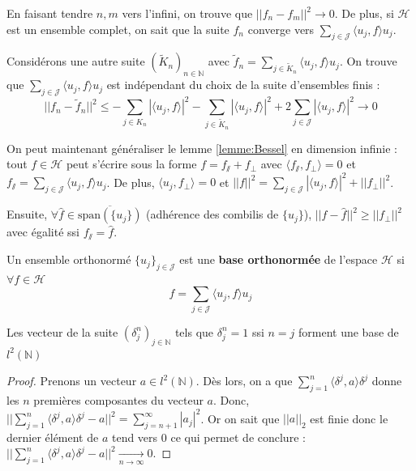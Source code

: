 En faisant tendre $n,m$ vers l'infini, on trouve que $||f_n-f_m||^2 \to 0$. De plus, si $\mathcal{H}$ est un ensemble complet, on sait que la suite $f_n$ converge vers $\sum \limits_{j\in\mathcal{J}} \langle u_j,f\rangle u_j$.

Considérons une autre suite $(\widetilde{K}_n)_{n\in\mathbb{N}}$ avec $\widetilde{f}_n = \sum_{j\in \widetilde{K}_n} \langle u_j,f\rangle u_j$. On trouve que $\sum_{j\in \mathcal{J}} \langle u_j,f\rangle u_j$ est indépendant du choix de la suite d'ensembles finis :
\begin{equation*}
    ||f_n - \widetilde{f}_n||^2 \leq  -\sum_{j\in K_n} |\langle u_j,f\rangle|^2 - \sum_{j\in \widetilde{K}_n} |\langle u_j,f\rangle|^2 + 2 \sum_{j\in \mathcal{J}} |\langle u_j,f\rangle|^2 \to 0
\end{equation*}

On peut maintenant généraliser le lemme \ref{lemme:Bessel} en dimension infinie : tout $f \in \mathcal{H}$ peut s'écrire sous la forme $f=f_\sslash + f_\bot$ avec $\langle f_\sslash,f_\bot \rangle = 0$ et $f_\sslash = \sum\limits_{j\in\mathcal{J}} \langle u_j,f\rangle u_j$. De plus, $\langle u_j,f_\bot\rangle = 0$ et $||f||^2 =\sum\limits_{j\in\mathcal{J}} |\langle u_j,f\rangle|^2+||f_\bot||^2$.

Ensuite, $\forall \hat{f} \in \overline{\text{span}(\{u_j\})}$ (adhérence des combilis de $\{u_j\}$), $||f-\hat{f}||^2\geq||f_\bot||^2$ avec égalité ssi $f_\sslash=\hat{f}$.

\begin{definition}
    Un ensemble orthonormé $\{u_j\}_{j\in\mathcal{J}}$ est une \textbf{base orthonormée} de l'espace $\mathcal{H}$ si $\forall f\in\mathcal{H}$
    \begin{equation*}
        f = \sum_{j\in\mathcal{J}} \langle u_j,f \rangle u_j
    \end{equation*}
\end{definition}

\begin{example}
    Les vecteur de la suite $(\delta^n_j)_{j\in\mathbb{N}}$ tels que $\delta^n_j=1$ ssi $n=j$ forment une base de $l^2(\mathbb{N})$
\end{example}
\begin{proof}
    Prenons un vecteur $a\in l^2(\mathbb{N})$. Dès lors, on a que $\sum \limits_{j=1}^n \langle \delta^j,a\rangle\delta^j$ donne les $n$ premières composantes du vecteur $a$. Donc, $||\sum \limits_{j=1}^n \langle \delta^j,a\rangle\delta^j-a||^2 = \sum \limits_{j=n+1}^\infty |a_j|^2$. Or on sait que $||a||_2$ est finie donc le dernier élément de $a$ tend vers $0$ ce qui permet de conclure : $||\sum \limits_{j=1}^n \langle \delta^j,a\rangle\delta^j-a||^2 \underset{n\to\infty}{\longrightarrow}0$.
\end{proof}

